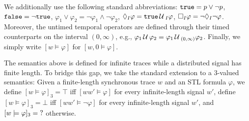 We additionally use the following standard abbreviations: $\texttt{true} = p \lor \lnot p$, $\texttt{false} = \lnot \texttt{true}$, $ \varphi_1 \lor \varphi_2 = \lnot \varphi_1 \land \lnot \varphi_2$, $\lozenge_I \varphi = \texttt{true} \,\mathcal{U}\,_I \varphi$, $\square_I \varphi = \lnot \lozenge_I \lnot \varphi$.
Moreover, the untimed temporal operators are defined through their timed counterparts on the interval $(0,\infty)$, e.g., $\varphi_1 \,\mathcal{U}\, \varphi_2 = \varphi_1 \,\mathcal{U}\,_{(0,\infty)} \varphi_2$.
Finally, we simply write $[w \models \varphi]$ for $[w,0 \models \varphi]$.

The semantics above is defined for infinite traces while a distributed signal has finite length.
To bridge this gap, we take the standard extension to a 3-valued semantics:
Given a finite-length synchronous trace $w$ and an STL formula $\varphi$, 
we define $[w \models \varphi]_3 = \top$ iff $[w w' \models \varphi]$ for every infinite-length signal $w'$, define $[w \models \varphi]_3 = \bot$ iff $[w w' \models \lnot \varphi]$ for every infinite-length signal $w'$, and $[w \models \varphi]_3 = \text{?}$ otherwise.